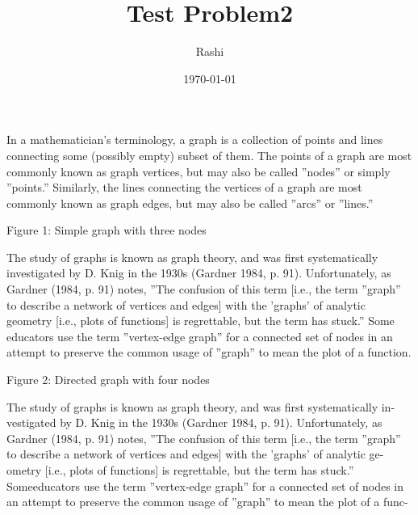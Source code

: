 \documentclass{article}
\begin{document}
	\title{Test Problem2}
	\author{Rashi}
	\date{\today}
	\maketitle
	In a mathematician’s terminology, a graph is a collection of points and lines
	connecting some (possibly empty) subset of them. The points of a graph are
	most commonly known as graph vertices, but may also be called ”nodes” or
	simply ”points.” Similarly, the lines connecting the vertices of a graph are most
	commonly known as graph edges, but may also be called ”arcs” or ”lines.”\\
	
	
	\begin{center}Figure 1: Simple graph with three nodes
	\end{center}
\vspace{0.7cm}
The study of graphs is known as graph theory, and was first systematically
investigated by D. Knig in the 1930s (Gardner 1984, p. 91). Unfortunately,
as Gardner (1984, p. 91) notes, ”The confusion of this term [i.e., the term
”graph” to describe a network of vertices and edges] with the ’graphs’ of analytic
geometry [i.e., plots of functions] is regrettable, but the term has stuck.” Some
educators use the term ”vertex-edge graph” for a connected set of nodes in
an attempt to preserve the common usage of ”graph” to mean the plot of a
function.\\
\begin{center}Figure 2: Directed graph with four nodes
\end{center}
The study of graphs is known as graph theory, and was first systematically in-
vestigated by D. Knig in the 1930s (Gardner 1984, p. 91). Unfortunately, as
Gardner (1984, p. 91) notes, ”The confusion of this term [i.e., the term ”graph”
to describe a network of vertices and edges] with the ’graphs’ of analytic ge-
ometry [i.e., plots of functions] is regrettable, but the term has stuck.” Someeducators use the term ”vertex-edge graph” for a connected set of nodes in an
attempt to preserve the common usage of ”graph” to mean the plot of a func-\\
\end{document}

